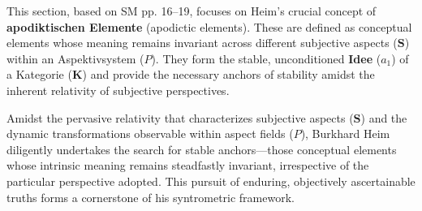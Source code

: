 \documentclass[12pt]{article}
\newcommand{\kategorie}{\bm{K}}
\newcommand{\conceptualsyndrome}{a} %
\newcommand{\aspektivsystem}{P}
\begin{document}
This section, based on SM pp. 16--19, focuses on Heim's crucial concept of \textbf{apodiktischen Elemente} (apodictic elements). These are defined as conceptual elements whose meaning remains invariant across different subjective aspects (\(\mathbf{S}\)) within an Aspektivsystem (\(\aspektivsystem\)). They form the stable, unconditioned \textbf{Idee} (\(\conceptualsyndrome_1\)) of a Kategorie (\(\kategorie\)) and provide the necessary anchors of stability amidst the inherent relativity of subjective perspectives.

Amidst the pervasive relativity that characterizes subjective aspects (\(\mathbf{S}\)) and the dynamic transformations observable within aspect fields (\(\aspektivsystem\)), Burkhard Heim diligently undertakes the search for stable anchors—those conceptual elements whose intrinsic meaning remains steadfastly invariant, irrespective of the particular perspective adopted. This pursuit of enduring, objectively ascertainable truths forms a cornerstone of his syntrometric framework. 
\end{document}
